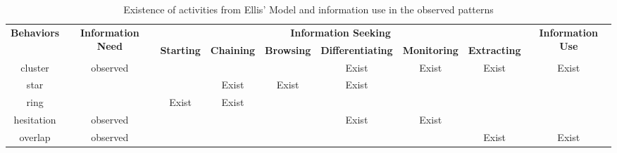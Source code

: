 \begin{table}[H]
    \small
    \centering
    \caption{Existence of activities from Ellis' Model and information use in the observed patterns}
    \begin{adjustbox}{width=\textwidth}
        \begin{tabular}{ccccccccc}
            \toprule
            \multicolumn{1}{c}{\multirow{2}{*}{\textbf{Behaviors}}}  & \multicolumn{1}{c}{\multirow{2}{*}{\textbf{Information Need}}} & \multicolumn{6}{c}{\textbf{Information Seeking}}                                    & \multicolumn{1}{c}{\multirow{2}{*}{\textbf{Information Use}}} \\ \cline{3-8}
            \multicolumn{1}{c}{}                                     & \multicolumn{1}{c}{}                                  & \textbf{Starting} & \textbf{Chaining} & \textbf{Browsing} & \textbf{Differentiating} & \textbf{Monitoring} & \textbf{Extracting} & \multicolumn{1}{c}{}  \\
            \hline
            cluster    &   observed &       &       &       & Exist & Exist & Exist & Exist \\
            star       &            &       & Exist & Exist & Exist &       &       &       \\
            ring       &            & Exist & Exist &       &       &       &       &       \\
            hesitation &   observed &       &       &       & Exist & Exist &       &       \\
            overlap    &   observed &       &       &       &       &       & Exist & Exist \\
            \bottomrule
        \end{tabular}
        \label{table:ellis}
    \end{adjustbox}
\end{table}

\cleardoublepage
